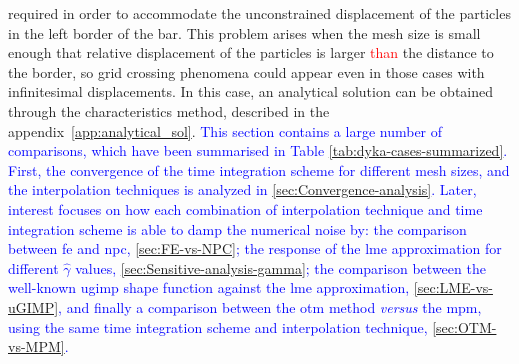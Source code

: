 \documentclass[preprint,12pt,a4paper]{elsarticle}
\begin{document}
required in order to accommodate the unconstrained displacement of the
particles in the left border of the bar. This problem arises
when the mesh size is small enough that relative displacement of the particles is larger \textcolor{red}{than} the distance to the border, so grid crossing phenomena could appear even in those cases with infinitesimal displacements. In this case, an analytical solution can be obtained through the characteristics method, described in the appendix~\ref{app:analytical_sol}. \textcolor{blue}{This section contains a large number of comparisons, which have been summarised in Table \ref{tab:dyka-cases-summarized}. First, the convergence of the time integration scheme for different mesh sizes, and the interpolation techniques is analyzed in  \ref{sec:Convergence-analysis}. Later, interest focuses on how each combination of interpolation technique and time integration scheme is able to damp the numerical noise by: the comparison between \acrshort{fe} and \acrshort{npc}, \ref{sec:FE-vs-NPC}; the response of the \acrshort{lme} approximation for different $\widehat{\gamma}$ values,  \ref{sec:Sensitive-analysis-gamma}; the comparison between the well-known \acrshort{ugimp} shape function against the \acrshort{lme} approximation, \ref{sec:LME-vs-uGIMP}, and finally a comparison between the \acrshort{otm} method \textit{versus} the \acrshort{mpm}, using the same time integration scheme and interpolation technique, \ref{sec:OTM-vs-MPM}.}
\end{document}
